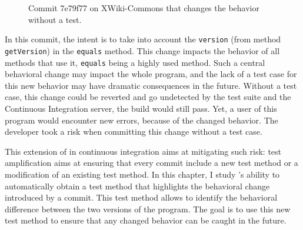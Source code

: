 \begin{figure}[h]
	\centering
	\caption{Commit 7e79f77 on XWiki-Commons that changes the behavior without a test.}
	\label{fig:motivating_example}
\end{figure}

In this commit, the intent is to take into account the \texttt{version} (from method \texttt{getVersion}) in the \texttt{equals} method.
This change impacts the behavior of all methods that use it, \texttt{equals} being a highly used method.
Such a central behavioral change may impact the whole program, and the lack of a test case for this new behavior may have dramatic consequences in the future.
Without a test case, this change could be reverted and go undetected by the test suite and the Continuous Integration server, \ie the build would still pass.
Yet, a user of this program would encounter new errors, because of the changed behavior.
The developer took a risk when committing this change without a test case.

This extension of \dspot in continuous integration aims at mitigating such risk: 
test amplification aims at ensuring that every commit include a new test method or a modification of an existing test method.
In this chapter, I study \dspot's ability to automatically obtain a test method that highlights the behavioral change introduced by a commit.
This test method allows to identify the behavioral difference between the two versions of the program. 
The goal is to use this new test method to ensure that any changed behavior can be caught in the future.

